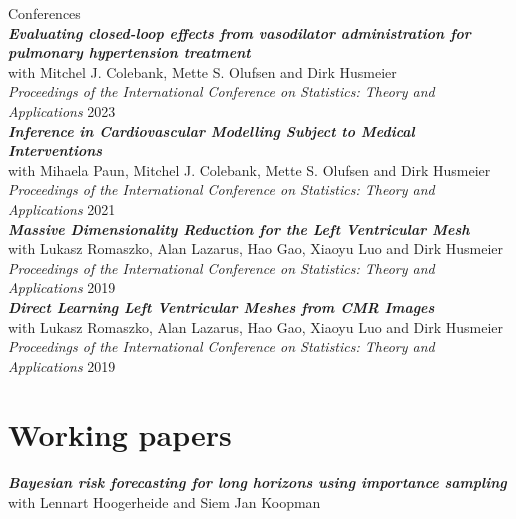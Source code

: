 \documentclass[margin,line]{resume}
\begin{document}
\begin{resume}
{\mysidestyle Conferences}  \vspace{1mm}\\	
\textit{\textbf{Evaluating closed-loop effects from vasodilator administration for pulmonary hypertension treatment}}\\
	with Mitchel J. Colebank,  Mette S. Olufsen and Dirk Husmeier\\
	\textit{Proceedings of the International Conference on Statistics: Theory and Applications} 2023  \vspace{2mm}\\
\textit{\textbf{Inference in Cardiovascular Modelling Subject to Medical Interventions}}\\
	with Mihaela Paun, Mitchel J. Colebank, Mette S. Olufsen and Dirk Husmeier\\
	\textit{Proceedings of the International Conference on Statistics: Theory and Applications} 2021  \vspace{2mm}\\
\textit{\textbf{Massive Dimensionality Reduction for the Left Ventricular Mesh}}\\
	with Lukasz Romaszko, Alan Lazarus, Hao Gao, Xiaoyu Luo and Dirk Husmeier\\
	\textit{Proceedings of the International Conference on Statistics: Theory and Applications} 2019  \vspace{2mm}\\
\textit{\textbf{Direct Learning Left Ventricular Meshes from CMR Images}}\\
	with Lukasz Romaszko, Alan Lazarus, Hao Gao, Xiaoyu Luo and Dirk Husmeier\\
	\textit{Proceedings of the International Conference on Statistics: Theory and Applications} 2019 \vspace{1mm} \\

%
%
\vspace{-5mm}    
\section{\mysidestyle Working papers}	

\textit{\textbf{Bayesian risk forecasting for long horizons using importance sampling}}\\
	with Lennart Hoogerheide and Siem Jan Koopman\\
%	
\vspace{-2mm}


\end{resume}
\end{document}
